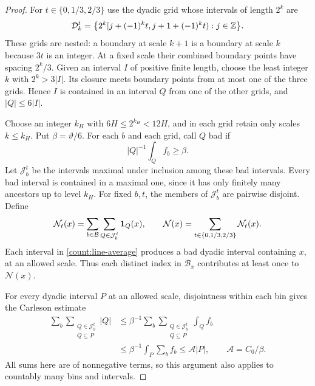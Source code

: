 \begin{proof}
For $t\in\{0,1/3,2/3\}$ use the dyadic grid whose intervals of
length $2^k$ are
\[
 \mathcal D_k^t
 =\big\{2^k[j+(-1)^kt,j+1+(-1)^kt):j\in\mathbb Z\big\}.
\]
These grids are nested: a boundary at scale $k+1$ is a boundary
at scale $k$ because $3t$ is an integer.  At a fixed scale their
combined boundary points have spacing $2^k/3$.  Given an interval
$I$ of positive finite length, choose the least integer $k$ with
$2^k>3|I|$.  Its closure meets boundary points from at most one of
the three grids.  Hence $I$ is contained in an interval $Q$ from
one of the other grids, and $|Q|\leq6|I|$.

Choose an integer $k_H$ with $6H\leq2^{k_H}<12H$, and in each grid
retain only scales $k\leq k_H$.  Put $\beta=\vartheta/6$.  For each
$b$ and each grid, call $Q$ bad if
\[
 |Q|^{-1}\int_Q f_b\geq\beta.
\]
Let $\mathcal J_b^t$ be the intervals maximal under inclusion among
these bad intervals.  Every bad interval is contained in a maximal
one, since it has only finitely many ancestors up to level $k_H$.
For fixed $b,t$, the members of $\mathcal J_b^t$ are pairwise
disjoint.  Define
\[
 \mathcal N_t(x)=\sum_{b\in\mathcal B}
                   \sum_{Q\in\mathcal J_b^t}\mathbf 1_Q(x),
 \qquad \mathcal N(x)=\sum_{t\in\{0,1/3,2/3\}}\mathcal N_t(x).
\]
Each interval in \eqref{count:line-average} produces a bad dyadic
interval containing $x$, at an allowed scale.  Thus each distinct
index in $\mathcal B_x$ contributes at least once to $\mathcal N(x)$.

For every dyadic interval $P$ at an allowed scale, disjointness
within each bin gives the Carleson estimate
\begin{equation}\label{count:carleson}
 \begin{split}
 \sum_b\sum_{\substack{Q\in\mathcal J_b^t\\Q\subseteq P}}|Q|
 &\leq\beta^{-1}\sum_b
            \sum_{\substack{Q\in\mathcal J_b^t\\Q\subseteq P}}
                         \int_Q f_b\\
 &\leq\beta^{-1}\int_P\sum_b f_b
 \leq\mathcal A|P|,\qquad \mathcal A=C_0/\beta.
 \end{split}
\end{equation}
All sums here are of nonnegative terms, so this argument also
applies to countably many bins and intervals.


\end{proof}
